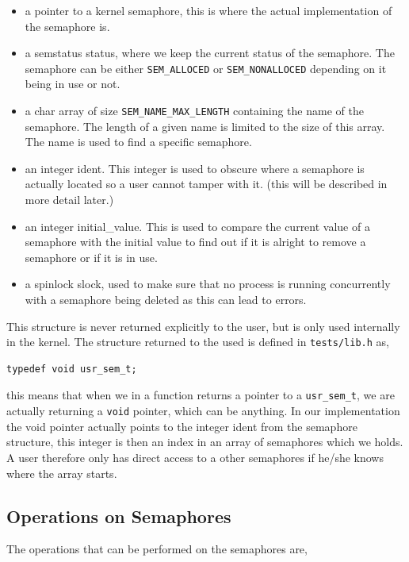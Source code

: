 \documentclass[11pt]{article}
\begin{document}
    \begin{itemize}
        \item a pointer to a kernel semaphore, this is where the actual
            implementation of the semaphore is.
        \item a semstatus status, where we keep the current status of the
            semaphore.  The semaphore can be either \texttt{SEM\_ALLOCED} or
            \texttt{SEM\_NONALLOCED} depending on it being in use or not.
        \item a char array of size \texttt{SEM\_NAME\_MAX\_LENGTH} containing the
            name of the semaphore.  The length of a given name is limited to
            the size of this array.  The name is used to find a specific
            semaphore.
        \item an integer ident.  This integer is used to obscure where a
            semaphore is actually located so a user cannot tamper with it. (this
            will be described in more detail later.)
        \item an integer initial\_value.  This is used to compare the current
            value of a semaphore with the initial value to find out if it is
            alright to remove a semaphore or if it is in use.
        \item a spinlock slock, used to make sure that no process is running
            concurrently with a semaphore being deleted as this can lead to
            errors.
    \end{itemize}

    This structure is never returned explicitly to the user, but is only used
    internally in the kernel.  The structure returned to the used is defined in
    \texttt{tests/lib.h} as,

    \begin{lstlisting}[style=customc]
typedef void usr_sem_t;
    \end{lstlisting}

    this means that when we in a function returns a pointer to a
    \texttt{usr\_sem\_t}, we are actually returning a \texttt{void} pointer,
    which can be anything.  In our implementation the void pointer actually
    points to the integer ident from the semaphore structure, this integer is
    then an index in an array of semaphores which we holds.  A user therefore
    only has direct access to a other semaphores if he/she knows where the array
    starts.

    \subsection{Operations on Semaphores}
    The operations that can be performed on the semaphores are,
\end{document}
